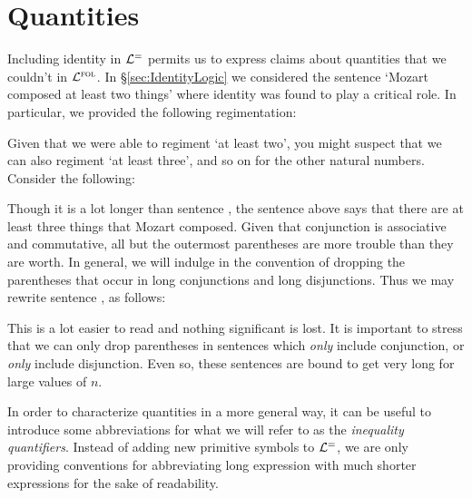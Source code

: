 \section{Quantities}
  \label{sec:Quantities}

Including identity in $\mathcal{L}^{=}$ permits us to express claims about quantities that we couldn't in $\mathcal{L}^{\textsc{fol}}$.
In \S\ref{sec:IdentityLogic} we considered the sentence `Mozart composed at least two things' where identity was found to play a critical role.
In particular, we provided the following regimentation:
\begin{oarg}[\ref{mozart}]
  \setcounter{eargnum}{2}
\end{oarg}
Given that we were able to regiment `at least two', you might suspect that we can also regiment `at least three', and so on for the other natural numbers.
Consider the following:
\begin{earg} \label{mozart3long}
\end{earg}
Though it is a lot longer than sentence , the sentence above says that there are at least three things that Mozart composed.
Given that conjunction is associative and commutative, all but the outermost parentheses are more trouble than they are worth.
In general, we will indulge in the convention of dropping the parentheses that occur in long conjunctions and long disjunctions.
Thus we may rewrite sentence , as follows:
\begin{earg} \label{mozart3}
\end{earg}
This is a lot easier to read and nothing significant is lost.
It is important to stress that we can only drop parentheses in sentences which \textit{only} include conjunction, or \textit{only} include disjunction.
Even so, these sentences are bound to get very long for large values of $n$.

In order to characterize quantities in a more general way, it can be useful to introduce some abbreviations for what we will refer to as the \textit{inequality quantifiers}.
Instead of adding new primitive symbols to $\mathcal{L}^{=}$, we are only providing conventions for abbreviating long expression with much shorter expressions for the sake of readability.

